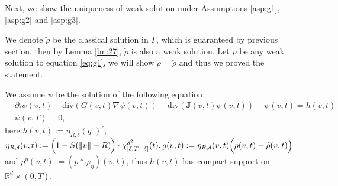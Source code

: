 \documentclass[a4paper, 11pt]{article}
\theoremstyle{plain}
\theoremstyle{remark}
\theoremstyle{definition}
\renewcommand{\div}{\mathrm{div}}
\newcommand{\J}{\boldsymbol{J}}
\begin{document}
Next, we show the uniqueness of weak solution under Assumptions \ref{asp:g1},\ref{asp:g2} and \ref{asp:g3}.


We denote $\tilde{\rho}$ be the classical solution in $\Gamma$, which is guaranteed by previous section, then by Lemma \ref{lm:27}, $\tilde{\rho}$ is also a weak solution. Let $\rho$ be any weak solution to equation \eqref{eq:g1}, we will show $\rho=\tilde{\rho}$ and thus we proved the statement.

We assume $\psi$ be the solution of the following equation
\begin{equation}\label{eq:gg119}
    \begin{aligned}
&\partial_t\psi(v,t)+\div(G(v,t)\nabla\psi(v,t))-\div({\J(v,t)}{\psi(v,t)})+\psi(v,t)=h(v,t)\\
        &{\psi}(v,T)=0,
    \end{aligned}
\end{equation}
	here $h(v,t):=\eta_{R,\delta}(g^{\epsilon})^{\epsilon}$,
    $\eta_{R,\delta}(v,t):=\Big(1-S(\norm{v}-R)\Big)\cdot\chi_{[\delta,T-\delta]}^{\delta^2}(t), g(v,t):=\eta_{R,\delta}(v,t)\Big(\rho(v,t)-\tilde{\rho}(v,t)\Big)$ and $p^\eta(v,t):=(p*\varphi_\eta)(v,t)$, thus $h(v,t)$ has compact support on $\mathbb{R}^d\times (0,T)$.
    
\end{document}

